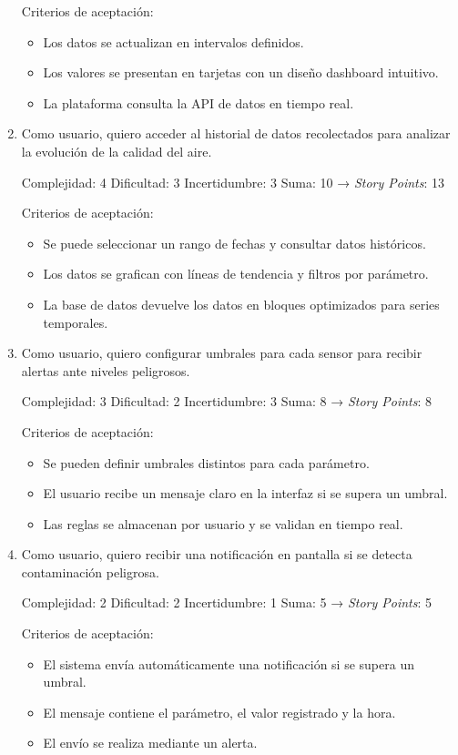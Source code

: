 \documentclass[
11pt, %
]{charter}
\begin{document}
\begin{enumerate}
	Criterios de aceptación:
	\begin{itemize}
		\item Los datos se actualizan en intervalos definidos.
		\item Los valores se presentan en tarjetas con un diseño dashboard intuitivo.
		\item La plataforma consulta la API de datos en tiempo real.
	\end{itemize}
	\item Como usuario, quiero acceder al historial de datos recolectados para analizar la evolución de la calidad del aire.

	Complejidad: 4
	Dificultad: 3
	Incertidumbre: 3
	Suma: 10 → \textit{Story Points}: 13

	Criterios de aceptación:
	\begin{itemize}
		\item Se puede seleccionar un rango de fechas y consultar datos históricos.
		\item Los datos se grafican con líneas de tendencia y filtros por parámetro.
		\item La base de datos devuelve los datos en bloques optimizados para series temporales.
	\end{itemize}
	
	\item Como usuario, quiero configurar umbrales para cada sensor para recibir alertas ante niveles peligrosos.

	Complejidad: 3
	Dificultad: 2
	Incertidumbre: 3
	Suma: 8 → \textit{Story Points}: 8

	Criterios de aceptación:
	\begin{itemize}
		\item Se pueden definir umbrales distintos para cada parámetro.
		\item El usuario recibe un mensaje claro en la interfaz si se supera un umbral.
		\item Las reglas se almacenan por usuario y se validan en tiempo real.
	\end{itemize}
	\item Como usuario, quiero recibir una notificación en pantalla si se detecta contaminación peligrosa.

	Complejidad: 2
	Dificultad: 2
	Incertidumbre: 1
	Suma: 5 → \textit{Story Points}: 5

	Criterios de aceptación:
	\begin{itemize}
		\item El sistema envía automáticamente una notificación si se supera un umbral.
		\item El mensaje contiene el parámetro, el valor registrado y la hora.
		\item El envío se realiza mediante un alerta.
	\end{itemize}	
	

\end{enumerate}
\end{document}
